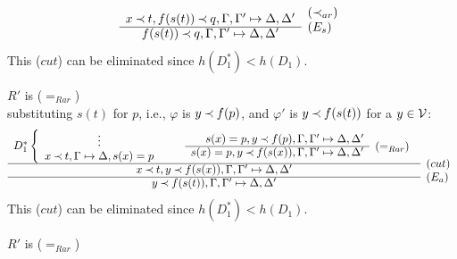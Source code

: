 \begin{PROOF}
\begin{LS}
\begin{LSA}
\begin{LSB}
\begin{LSC}
\begin{LSD}
\[\begin{array}{cl}
x\Incl t, f(s(t))\Incl q, \Gamma, \Gamma' \Seq \Delta, \Delta' 
 &   \raisebox{1.2ex}[1.5ex][0ex]{($\Incl_{ar}$)} \\ \cline{1-1}
f(s(t))\Incl q, \Gamma, \Gamma' \Seq \Delta, \Delta' 
 &   \raisebox{1.2ex}[1.5ex][0ex]{($E_s$)}
\end{array} \]
This ($cut$) can be eliminated since $h(D_1^*)<h(D_1)$.
%
\item $R'$ is ($=_{Rar}$)\\
substituting $s(t)$ for $p$, i.e., $\varphi$ is $y\mathbin{\prec} f(p)$, and $\varphi'$ is
$y\mathbin{\prec} f(s(t))$ for a $y\in{\cal V}$:
\[ \begin{array}{cl}
D_1^* \left \{ \begin{array}{c} \vdots \\ 
 x\Incl t, \GSD, s(x)=p \end{array} \right . \ \ \ \ \ \ 
\begin{array}{rl}
 s(x)=p, y\Incl f(p), \Gamma, \Gamma' \Seq \Delta, \Delta' \\
 \cline{1-1}
 s(x)=p, y\Incl f(s(x)), \Gamma, \Gamma' \Seq \Delta, \Delta' 
 &   \raisebox{1.2ex}[1.5ex][0ex]{($=_{Rar}$)} 
 \end{array} \\ \cline{1-1}
x\Incl t, y\Incl f(s(x)), \Gamma, \Gamma' \Seq \Delta, \Delta' 
 &   \raisebox{1.2ex}[1.5ex][0ex]{($cut$)} \\ \cline{1-1}
y\Incl f(s(t)), \Gamma, \Gamma' \Seq \Delta, \Delta' 
 &   \raisebox{1.2ex}[1.5ex][0ex]{($E_a$)}
\end{array} \]
This ($cut$) can be eliminated since $h(D_1^*)<h(D_1)$.
%
\item $R'$ is ($=_{Rar}$)\\

\end{LSD}
\end{LSC}
\end{LSB}
\end{LSA}
\end{LS}
\end{PROOF}
